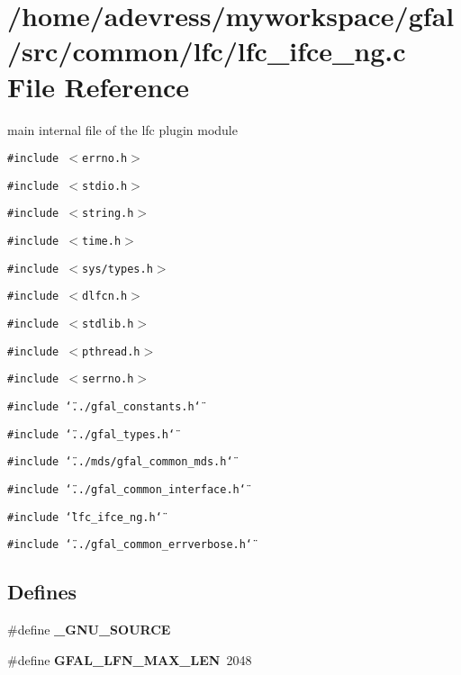 \section{/home/adevress/myworkspace/gfal/src/common/lfc/lfc\_\-ifce\_\-ng.c File Reference}
\label{lfc__ifce__ng_8c}
main internal file of the lfc plugin module 

{\tt \#include $<$errno.h$>$}\par
{\tt \#include $<$stdio.h$>$}\par
{\tt \#include $<$string.h$>$}\par
{\tt \#include $<$time.h$>$}\par
{\tt \#include $<$sys/types.h$>$}\par
{\tt \#include $<$dlfcn.h$>$}\par
{\tt \#include $<$stdlib.h$>$}\par
{\tt \#include $<$pthread.h$>$}\par
{\tt \#include $<$serrno.h$>$}\par
{\tt \#include \char`\"{}../gfal\_\-constants.h\char`\"{}}\par
{\tt \#include \char`\"{}../gfal\_\-types.h\char`\"{}}\par
{\tt \#include \char`\"{}../mds/gfal\_\-common\_\-mds.h\char`\"{}}\par
{\tt \#include \char`\"{}../gfal\_\-common\_\-interface.h\char`\"{}}\par
{\tt \#include \char`\"{}lfc\_\-ifce\_\-ng.h\char`\"{}}\par
{\tt \#include \char`\"{}../gfal\_\-common\_\-errverbose.h\char`\"{}}\par
\subsection*{Defines}
\begin{CompactItemize}
\item 
\#define \textbf{\_\-GNU\_\-SOURCE}\label{lfc__ifce__ng_8c_53abf256730d533302d1910e5fb61efe}

\item 
\#define \textbf{GFAL\_\-LFN\_\-MAX\_\-LEN}~2048\label{lfc__ifce__ng_8c_74cbac9029a516b4ae28199debf71835}

\end{CompactItemize}
